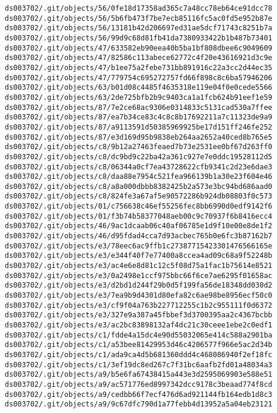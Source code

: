 \documentclass[11pt]{article}
\begin{document}
\begin{Verbatim}[commandchars=\\\{\}]
ds003702/.git/objects/56/0fe18d17358ad365c7a48cc78eb64ce91dcc78
ds003702/.git/objects/56/5b6fb473f7be7ecb85116fc5ac0fd5e952b87e
ds003702/.git/objects/56/13181b42d206697ed31ae5dcf71743c8251b7a
ds003702/.git/objects/56/99d9c68d81fb41da7380933422b1b487b73401
ds003702/.git/objects/47/633582eb90eea40b5ba1bf808dbee6c9049609
ds003702/.git/objects/47/82586c113abece62772c4f20e43616921d3c9e
ds003702/.git/objects/47/b1ee75a2febe731bb891916c22a3cc2d44ec35
ds003702/.git/objects/47/779754c695272757fd66f898c8c6ba57946206
ds003702/.git/objects/63/b01d08c4485f4635318e119e04f0e0cede5566
ds003702/.git/objects/63/2de725bfb2b9c9403ca1a1fcb624b91eef1e59
ds003702/.git/objects/87/7e2ce68ac9306e0314833c5131cad530a7ffee
ds003702/.git/objects/87/ea7b34ce83c4c8c8b17692211a7c11323de9a9
ds003702/.git/objects/87/a9113591d50385969925be17d151ff246fe252
ds003702/.git/objects/87/e3d169d95b9838eb264aa2652a40ced8b765e5
ds003702/.git/objects/c8/9b12a27463feaed7b73e2531ee0bf67d263ff0
ds003702/.git/objects/c8/dc9bd9c22ba42a361c927e7e0ddc19528112d5
ds003702/.git/objects/c8/06344a0cf7ea43728622cfb9341c2d23e6dae3
ds003702/.git/objects/c8/daa88e7954c521fea966139b1a30e23f604e46
ds003702/.git/objects/c8/a8a000dbbb8382425b2a573e3bc94bd686aad0
ds003702/.git/objects/c8/824fe3a67af5e90572286b924db08803f0c573
ds003702/.git/objects/01/c756638c46ef55256fec8bb6990d0edf9142f6
ds003702/.git/objects/01/f3b74b58377048aeb00c9c70937f6b8416ecc4
ds003702/.git/objects/46/9ac1dcaab06c40af06785e1d9f10e00e8de1f2
ds003702/.git/objects/46/d95fdad4cca7d93acbec765b0e6fc3b87162b7
ds003702/.git/objects/e3/78eec6ac9ffb1c27387715423301476566165e
ds003702/.git/objects/e3/e344f40f7e77400a8ccea4ad09c68a9f52248b
ds003702/.git/objects/e3/ac4e6e8d81c12c5f08d75a1fac1b75614e8521
ds003702/.git/objects/e3/0a2498e1ccf975bbc66f6ce7ae6295f01658ac
ds003702/.git/objects/e3/d2bd1d244f29b0d5f199fa56de18348dd030d2
ds003702/.git/objects/e3/7ea9b9d4301d80efa82c6ae98be8956ecf50c0
ds003702/.git/objects/e3/cf9f04a763b227712255c1b2c955111f0d6372
ds003702/.git/objects/e3/327e9a387a45fbbef3d3700395aa2c4367bcbb
ds003702/.git/objects/e3/ac2bc83898132af4dc21c30ceee1ebe2c0edf1
ds003702/.git/objects/c1/fdde4a15dc4e90d55032065e414c588a2901ba
ds003702/.git/objects/c1/a53bee81429953d46c4206577f966e5ac2d34b
ds003702/.git/objects/c1/ada9ca4d5b681360ddd4c468086940f2ef18fc
ds003702/.git/objects/c1/3ef19dc8ed267c7f31bc6aafb2fd01a48034a3
ds003702/.git/objects/a9/b5e6fa67438415a443e3d2595069903e588e51
ds003702/.git/objects/a9/ac571776ed8997342dcc9178c3beaad774f8cd
ds003702/.git/objects/a9/cedbb66f7ecf476d6ad921144fb164edb1d8c3
ds003702/.git/objects/a9/9c67dfc790d1a77febb4d13952a5a04eb23121

\end{Verbatim}
\end{document}
